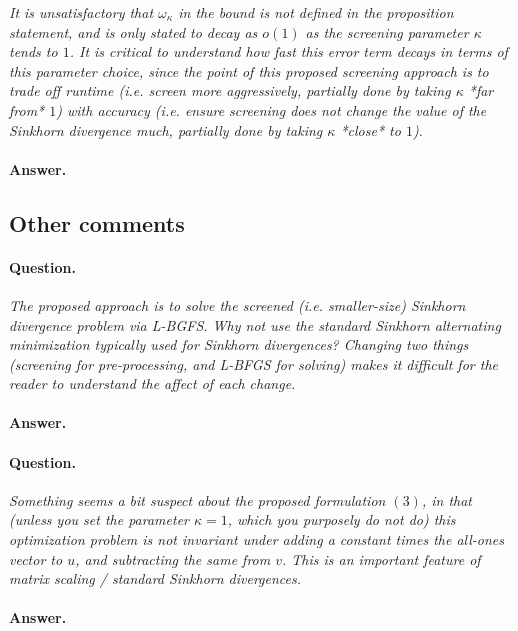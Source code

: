\documentclass[11pt]{article}
\begin{document}
\emph{It is unsatisfactory that $\omega_\kappa$ in the bound is not defined in the proposition statement, and is only stated to decay as $o(1)$ as the screening parameter $\kappa$ tends to $1$. It is critical to understand how fast this error term decays in terms of this parameter choice, since the point of this proposed screening approach is to trade off runtime (i.e. screen more aggressively, partially done by taking $\kappa$ { *far from* } $1$) with accuracy (i.e. ensure screening does not change the value of the Sinkhorn divergence much, partially done by taking $\kappa$ {*close*} to $1$).}

\paragraph{Answer.} 

\subsection{Other comments}

\paragraph{Question.}

\emph{The proposed approach is to solve the screened (i.e. smaller-size) Sinkhorn divergence problem via L-BGFS. Why not use the standard Sinkhorn alternating minimization typically used for Sinkhorn divergences? Changing two things (screening for pre-processing, and L-BFGS for solving) makes it difficult for the reader to understand the affect of each change.}

\paragraph{Answer.} 


\paragraph{Question.}

\emph{Something seems a bit suspect about the proposed formulation $(3)$, in that (unless you set the parameter $\kappa=1$, which you purposely do not do) this optimization problem is not invariant under adding a constant times the all-ones vector to $u$, and subtracting the same from $v$. This is an important feature of matrix scaling / standard Sinkhorn divergences.}

\paragraph{Answer.} 
\end{document}
